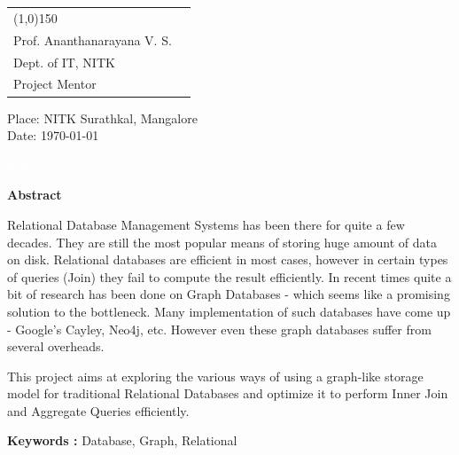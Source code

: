 \documentclass[12pt, oneside]{book}
\begin{document}
\\
\\
\begin{tabular}{l@{\hskip 4cm} r}
	\line(1,0){150} \\
	 Prof. Ananthanarayana V. S. \\
	 Dept. of IT, NITK \\
	 Project Mentor \\ 
\end{tabular}

\vspace{4cm}
\begin{flushleft}
Place: NITK Surathkal, Mangalore \\
Date: \today
\end{flushleft}

\pagebreak \textcolor{white}{text}
\thispagestyle{empty}
\begin{center}
	\textbf{ \huge Abstract}
\end{center}
\vspace{1cm}
Relational Database Management Systems has been there for quite a few decades. They are still the most popular means of storing huge amount of data on disk. Relational databases are efficient in most cases, however in certain types of queries (Join) they fail to compute the result efficiently. In recent times quite a bit of research has been done on Graph Databases - which seems like  a promising solution to the bottleneck. Many implementation of such databases have come up - Google's Cayley, Neo4j, etc. However even these graph databases suffer from several overheads.
\par
This project aims at exploring the various ways of using a graph-like storage model for traditional Relational Databases and optimize it to perform Inner Join and Aggregate Queries efficiently.
\par
\textbf{Keywords : }Database, Graph, Relational

\thispagestyle{empty}
{\listoffigures}
{\listoftables}
{\tableofcontents}

\setcounter{page}{1}
\end{document}
